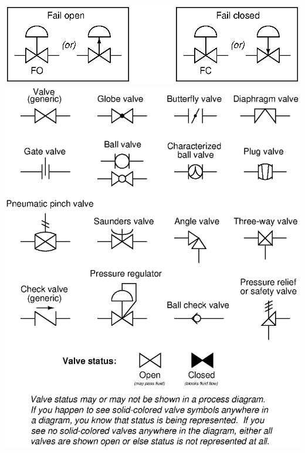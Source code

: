 \includegraphics[width=1\textwidth]{diagrams05.eps}
\includegraphics[width=1\textwidth]{diagrams02.eps}
\newpage
